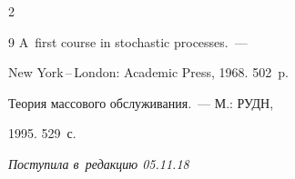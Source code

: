\begin{multicols}{2}
{{\begin{thebibliography}{9}
 A~first course in stochastic processes.~--- 


New York\,--\,London: Academic Press, 1968. 502~p.







 Теория массового обслуживания.~--- М.: РУДН,


1995. 529~с.








 \end{thebibliography}





 }


 }





\end{multicols}





\vspace*{-3pt}





\hfill{\small\textit{Поступила в~редакцию 05.11.18}}















\newpage





\vspace*{-29pt}




















